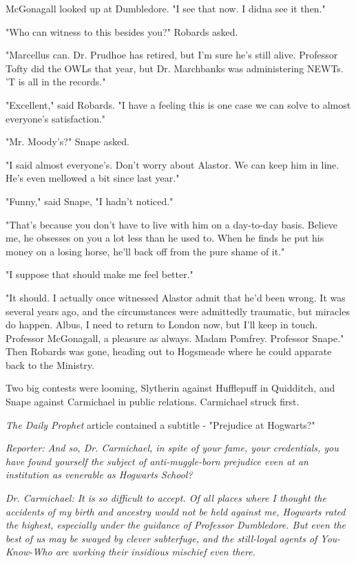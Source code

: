\documentclass[a4paper,11pt]{article}
\begin{document}
McGonagall looked up at Dumbledore. "I see that now. I didna see it then."

"Who can witness to this besides you?" Robards asked.

"Marcellus can. Dr. Prudhoe has retired, but I'm sure he's still alive. Professor Tofty did the OWLs that year, but Dr. Marchbanks was administering NEWTs. 'T is all in the records."

"Excellent," said Robards. "I have a feeling this is one case we can solve to almost everyone's satisfaction."

"Mr. Moody's?" Snape asked.

"I said almost everyone's. Don't worry about Alastor. We can keep him in line. He's even mellowed a bit since last year."

"Funny," said Snape, "I hadn't noticed."

"That's because you don't have to live with him on a day-to-day basis. Believe me, he obsesses on you a lot less than he used to. When he finds he put his money on a losing horse, he'll back off from the pure shame of it."

"I suppose that should make me feel better."

"It should. I actually once witnessed Alastor admit that he'd been wrong. It was several years ago, and the circumstances were admittedly traumatic, but miracles do happen. Albus, I need to return to London now, but I'll keep in touch. Professor McGonagall, a pleasure as always. Madam Pomfrey. Professor Snape." Then Robards was gone, heading out to Hogsmeade where he could apparate back to the Ministry.

Two big contests were looming, Slytherin against Hufflepuff in Quidditch, and Snape against Carmichael in public relations. Carmichael struck first.

\emph{The Daily Prophet} article contained a subtitle - "Prejudice at Hogwarts?"

\emph{Reporter: And so, Dr. Carmichael, in spite of your fame, your credentials, you have found yourself the subject of anti-muggle-born prejudice even at an institution as venerable as Hogwarts School?}

\emph{Dr. Carmichael: It is so difficult to accept. Of all places where I thought the accidents of my birth and ancestry would not be held against me, Hogwarts rated the highest, especially under the guidance of Professor Dumbledore. But even the best of us may be swayed by clever subterfuge, and the still-loyal agents of You-Know-Who are working their insidious mischief even there.}
\end{document}
